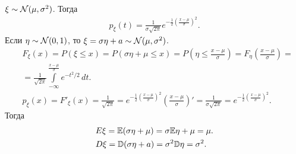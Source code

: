 \begin{exmpl}
 $ \xi \sim \mathcal N(\mu,\sigma^{2}) $. Тогда
 \begin{align*}
  p_\xi(t) = \frac{1}{\sigma\sqrt{2\pi}} e^{-\frac{1}{2} \left( \frac{x-\mu}{\sigma} \right)^{2}}.
 \end{align*} Если $ \eta \sim \mathcal N(0,1) $, то $ \xi = \sigma \eta + a \sim \mathcal N(\mu,\sigma^{2}) $.
\begin{align*}
 &F_\xi(x) = P(\xi \leqslant x) = P(\sigma\eta + \mu \leqslant x) = P\left(\eta \leqslant \frac{x-\mu}{\sigma}\right) = F_{\eta}\left( \frac{x-\mu}{\sigma} \right) = \\
 &= \frac{1}{\sqrt{2\pi}} \int\limits_{-\infty}^{\frac{x-\mu}{\sigma}} e^{-t^{2} / 2}\,dt. \\
 &p_\xi(x) = F'_\xi(x) = \frac{1}{\sqrt{2\pi}} = e^{-\frac{1}{2} \left( \frac{x-\mu}{\sigma} \right)^{2}} \left( \frac{x-\mu}{\sigma} \right)' = \frac{1}{\sigma\sqrt{2\pi}} = e^{-\frac{1}{2} \left( \frac{x-\mu}{\sigma} \right)^{2}}.
\end{align*} Тогда
\begin{align*}
 &E\xi = \mathbb E(\sigma \eta + \mu)  = \sigma \mathbb E\eta + \mu = \mu.\\
 &D\xi = \mathbb D(\sigma\eta + a) = \sigma^{2}\mathbb D\eta = \sigma^{2}.
\end{align*} 
\end{exmpl}

